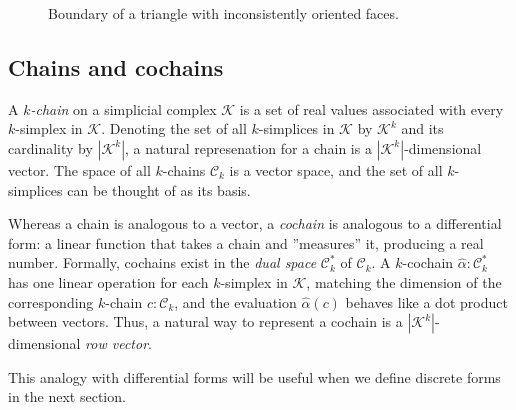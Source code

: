 \documentclass[utf8,english]{gradu3}
\begin{document}
\begin{figure}[h]
  \centering
  \caption{
    \label{fig:triangle_boundary}
    Boundary of a triangle with inconsistently oriented faces.
  }
\end{figure}


\subsection{Chains and cochains}\label{sec:chains}

A \textit{$k$-chain} on a simplicial complex $\mathcal{K}$
is a set of real values associated with every $k$-simplex in $\mathcal{K}$.
Denoting the set of all $k$-simplices in $\mathcal{K}$ by $\mathcal{K}^k$
and its cardinality by $|\mathcal{K}^k|$,
a natural represenation for a chain is a $|\mathcal{K}^k|$-dimensional vector.
The space of all $k$-chains $\mathcal{C}_k$ is a vector space,
and the set of all $k$-simplices can be thought of as its basis.

Whereas a chain is analogous to a vector,
a \textit{cochain} is analogous to a differential form:
a linear function that takes a chain and ''measures'' it,
producing a real number.
Formally, cochains exist in the \textit{dual space} $\mathcal{C}_k^*$ of $\mathcal{C}_k$.
A $k$-cochain $\widehat{\alpha} : \mathcal{C}_k^*$
has one linear operation for each $k$-simplex in $\mathcal{K}$,
matching the dimension of the corresponding $k$-chain $c : \mathcal{C}_k$,
and the evaluation $\widehat{\alpha}(c)$
behaves like a dot product between vectors.
Thus, a natural way to represent a cochain
is a $|\mathcal{K}^k|$-dimensional \textit{row vector}.

This analogy with differential forms will be useful
when we define discrete forms in the next section.
\end{document}

